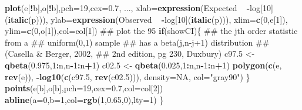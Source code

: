 \documentclass[]{article}
\newenvironment{Shaded}{\begin{snugshade}}{\end{snugshade}}
\newcommand{\KeywordTok}[1]{\textcolor[rgb]{0.13,0.29,0.53}{\textbf{#1}}}
\newcommand{\DataTypeTok}[1]{\textcolor[rgb]{0.13,0.29,0.53}{#1}}
\newcommand{\DecValTok}[1]{\textcolor[rgb]{0.00,0.00,0.81}{#1}}
\newcommand{\FloatTok}[1]{\textcolor[rgb]{0.00,0.00,0.81}{#1}}
\newcommand{\StringTok}[1]{\textcolor[rgb]{0.31,0.60,0.02}{#1}}
\newcommand{\OtherTok}[1]{\textcolor[rgb]{0.56,0.35,0.01}{#1}}
\newcommand{\ControlFlowTok}[1]{\textcolor[rgb]{0.13,0.29,0.53}{\textbf{#1}}}
\newcommand{\OperatorTok}[1]{\textcolor[rgb]{0.81,0.36,0.00}{\textbf{#1}}}
\newcommand{\ErrorTok}[1]{\textcolor[rgb]{0.64,0.00,0.00}{\textbf{#1}}}
\newcommand{\NormalTok}[1]{#1}
\begin{document}
\begin{Shaded}
\begin{Highlighting}[]
  \KeywordTok{plot}\NormalTok{(e[}\OperatorTok{!}\NormalTok{b],o[}\OperatorTok{!}\NormalTok{b],}\DataTypeTok{pch=}\DecValTok{19}\NormalTok{,}\DataTypeTok{cex=}\FloatTok{0.7}\NormalTok{, ...,}
       \DataTypeTok{xlab=}\KeywordTok{expression}\NormalTok{(Expected}\OperatorTok{~}\ErrorTok{~}\OperatorTok{-}\NormalTok{log[}\DecValTok{10}\NormalTok{](}\KeywordTok{italic}\NormalTok{(p))),}
       \DataTypeTok{ylab=}\KeywordTok{expression}\NormalTok{(Observed}\OperatorTok{~}\ErrorTok{~}\OperatorTok{-}\NormalTok{log[}\DecValTok{10}\NormalTok{](}\KeywordTok{italic}\NormalTok{(p))),}
       \DataTypeTok{xlim=}\KeywordTok{c}\NormalTok{(}\DecValTok{0}\NormalTok{,e[}\DecValTok{1}\NormalTok{]), }\DataTypeTok{ylim=}\KeywordTok{c}\NormalTok{(}\DecValTok{0}\NormalTok{,o[}\DecValTok{1}\NormalTok{]),}\DataTypeTok{col=}\NormalTok{col[}\DecValTok{1}\NormalTok{])}
\NormalTok{  ## plot the 95% confidence interval (pointwise)}
  \ControlFlowTok{if}\NormalTok{(showCI)\{}
\NormalTok{    ## the jth order statistic from a}
\NormalTok{    ## uniform(0,1) sample}
\NormalTok{    ## has a beta(j,n-j+1) distribution}
\NormalTok{    ## (Casella & Berger, 2002,}
\NormalTok{    ## 2nd edition, pg 230, Duxbury)}
\NormalTok{    c97.}\DecValTok{5}\NormalTok{ <-}\StringTok{ }\KeywordTok{qbeta}\NormalTok{(}\FloatTok{0.975}\NormalTok{,}\DecValTok{1}\OperatorTok{:}\NormalTok{n,n}\OperatorTok{-}\DecValTok{1}\OperatorTok{:}\NormalTok{n}\OperatorTok{+}\DecValTok{1}\NormalTok{)}
\NormalTok{    c02.}\DecValTok{5}\NormalTok{ <-}\StringTok{ }\KeywordTok{qbeta}\NormalTok{(}\FloatTok{0.025}\NormalTok{,}\DecValTok{1}\OperatorTok{:}\NormalTok{n,n}\OperatorTok{-}\DecValTok{1}\OperatorTok{:}\NormalTok{n}\OperatorTok{+}\DecValTok{1}\NormalTok{)}
    \KeywordTok{polygon}\NormalTok{(}\KeywordTok{c}\NormalTok{(e, }\KeywordTok{rev}\NormalTok{(e)), }\OperatorTok{-}\KeywordTok{log10}\NormalTok{(}\KeywordTok{c}\NormalTok{(c97.}\DecValTok{5}\NormalTok{, }\KeywordTok{rev}\NormalTok{(c02.}\DecValTok{5}\NormalTok{))), }\DataTypeTok{density=}\OtherTok{NA}\NormalTok{, }\DataTypeTok{col=}\StringTok{"gray90"}\NormalTok{)}
\NormalTok{  \}}
  \KeywordTok{points}\NormalTok{(e[b],o[b],}\DataTypeTok{pch=}\DecValTok{19}\NormalTok{,}\DataTypeTok{cex=}\FloatTok{0.7}\NormalTok{,}\DataTypeTok{col=}\NormalTok{col[}\DecValTok{2}\NormalTok{])}
  \KeywordTok{abline}\NormalTok{(}\DataTypeTok{a=}\DecValTok{0}\NormalTok{,}\DataTypeTok{b=}\DecValTok{1}\NormalTok{,}\DataTypeTok{col=}\KeywordTok{rgb}\NormalTok{(}\DecValTok{1}\NormalTok{,}\FloatTok{0.65}\NormalTok{,}\DecValTok{0}\NormalTok{),}\DataTypeTok{lty=}\DecValTok{1}\NormalTok{)}
\NormalTok{\}}

}
\end{Highlighting}
\end{Shaded}
\end{document}
